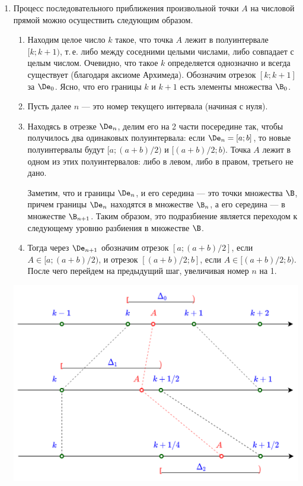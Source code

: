 \begin{enumerate}
\item Процесс последовательного приближения произвольной точки $A$ на числовой прямой можно осуществить следующим образом.
\begin{enumerate}[{\bf Шаг1}]
\item Находим целое число $k$ такое, что точка $A$ лежит в полуинтервале $[k;k+1)$, т.\,е. либо между соседними целыми числами, либо совпадает с целым числом. Очевидно, что такое $k$ определяется однозначно и всегда существует (благодаря аксиоме Архимеда). Обозначим отрезок $[k;k+1]$ за $\De_0$. Ясно, что его границы $k$ и $k+1$ есть элементы множества $\B_0$.
\item Пусть далее $n$ --- это номер текущего интервала (начиная с нуля).
\item Находясь в отрезке $\De_n$, делим его на 2 части посередине так, чтобы получилось два одинаковых полуинтервала: если $\De_n=[a;b]$, то новые полуинтервалы будут $[a;(a+b)/2)$ и $[(a+b)/2;b)$. Точка $A$ лежит в одном из этих полуинтервалов: либо в левом, либо в правом, третьего не дано.

Заметим, что и границы $\De_n$, и его середина --- это точки множества $\B$, причем границы $\De_n$ находятся в множестве $\B_n$, а его середина --- в множестве $\B_{n+1}$. Таким образом, это подразбиение является переходом к следующему уровню разбиения в множестве $\B$.
\item Тогда через $\De_{n+1}$ обозначим отрезок $[a;(a+b)/2]$, если $A\in[a;(a+b)/2)$, и отрезок $[(a+b)/2;b]$, если $A\in[(a+b)/2;b)$. После чего перейдем на предыдущий шаг, увеличивая номер $n$ на 1.
\end{enumerate}

\begin{center}
\includegraphics[scale=0.3]{Step1-3.png}
\end{center}


\end{enumerate}
